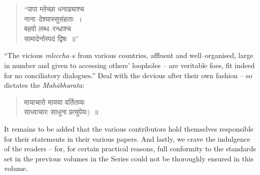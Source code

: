 \begin{verse}
“पापा म्लेच्छा धनाढ्याश्च \\ नाना–देश्यास्सुसंहताः~।\\ बहवो लब्ध–रन्ध्राश्च \\ सामादेर्नास्पदं द्विषः~॥”
\end{verse}

“The vicious \textit{mleccha}–s from various countries, affluent and well–organised, large in number and given to accessing others’ loopholes – are veritable foes, fit indeed for no conciliatory dialogues.” Deal with the devious after their own fashion – so dictates the \textit{Mahābharata}:

\begin{verse}
मायाचारो मायया वर्तितव्यः \\ साध्वाचारः साधुना प्रत्युपेयः)~॥
\end{verse}

It remains to be added that the various contributors hold themselves responsible for their statements in their various papers. And lastly, we crave the indulgence of the readers – for, for certain practical reasons, full conformity to the standards set in the previous volumes in the Series could not be thoroughly ensured in this volume.

